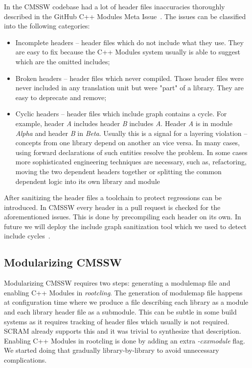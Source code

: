 \documentclass[12pt]{iopart}
\begin{document}
In the CMSSW codebase had a lot of header files inaccuracies thoroughly described in the GitHub C++ Modules Meta Issue~\cite{Modules-gh-metaissue}. The issues can be classified into the following categories:
\begin{itemize}
    \item Incomplete headers -- header files which do not include what they use. They are easy to fix because the C++ Modules system usually is able to suggest which are the omitted includes;
    \item Broken headers -- header files which never compiled. Those header files were never included in any translation unit but were "part" of a library. They are easy to deprecate and remove;
    \item Cyclic headers -- header files which include graph contains a cycle. For example, header \textit{A} includes header \textit{B} includes \textit{A}. Header \textit{A} is in module \textit{Alpha} and header \textit{B} in \textit{Beta}. Usually this is a signal for a layering violation -- concepts from one library depend on another an vice versa. In many cases, using forward declarations of such entities resolve the problem. In some cases more sophisticated engineering techniques are necessary, such as, refactoring, moving the two dependent headers together or splitting the common dependent logic into its own library and module
\end{itemize}

After sanitizing the header files a toolchain to protect regressions can be introduced. In CMSSW every header in a pull request is checked for the aforementioned issues. This is done by precompiling each header on its own. In future we will deploy the include graph sanitization tool which we used to detect include cycles~\cite{scram-cycle-break}.

\subsection{Modularizing CMSSW}

Modularizing CMSSW requires two steps: generating a modulemap file and enabling C++ Modules in \textit{rootcling}. The generation of modulemap file happens at configuration time where we produce a file describing each library as a module and each library header file as a submodule. This can be subtle in some build systems as it requires tracking of header files which usually is not required. SCRAM already supports this and it was trivial to synthesize that description. Enabling C++ Modules in rootcling is done by adding an extra \textit{-cxxmodule} flag. We started doing that gradually library-by-library to avoid unnecessary complications.
\end{document}
